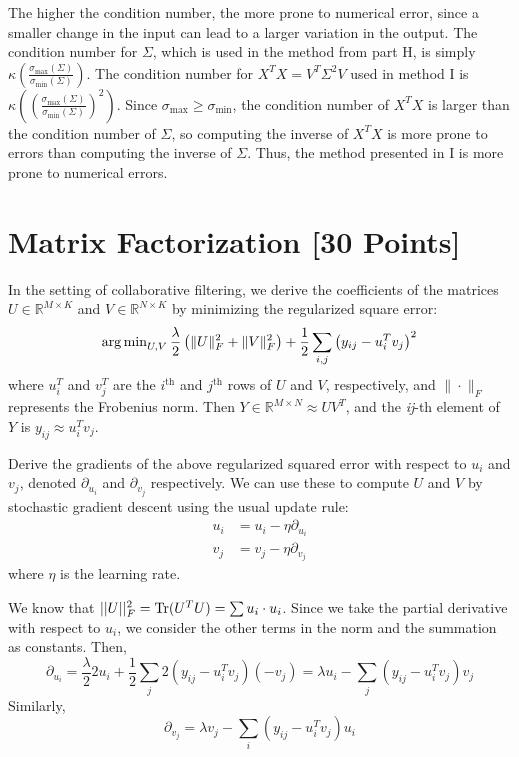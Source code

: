 \begin{solution}
    The higher the condition number, the more prone to numerical error, since a smaller change in the input can lead to a larger variation in the output. The condition number for $\Sigma$, which is used in the method from part H, is simply $\kappa \left(\frac{\sigma_\text{max}(\Sigma)}{\sigma_\text{min}(\Sigma)} \right)$. The condition number for $X^T X = V^T \Sigma^2 V$ used in method I is $\kappa \left( \left( \frac{\sigma_\text{max}(\Sigma)}{\sigma_\text{min}(\Sigma)} \right)^2 \right)$. Since $\sigma_\text{max} \geq \sigma_\text{min}$, the condition number of $X^T X$ is larger than the condition number of $\Sigma$, so computing the inverse of $X^T X$ is more prone to errors than computing the inverse of $\Sigma$. Thus, the method presented in I is more prone to numerical errors.
\end{solution}


\newpage
\section{Matrix Factorization [30 Points]}

In the setting of collaborative filtering, we derive the coefficients of the matrices $U \in \mathbb{R}^{M \times K}$ and $V \in \mathbb{R}^{N \times K}$ by minimizing the regularized square error:
$$\operatorname{arg\,min}_{U,V} \frac{\lambda}{2} \left( \|U\|_F^2 + \|V\|^2_F \right) + \frac{1}{2}\sum_{i,j} \left( y_{ij} - u_i^Tv_j\right)^2$$
where $u_i^T$ and $v_j^T$ are the $i^{\text{th}}$ and $j^{\text{th}}$ rows of $U$ and $V$, respectively, and $\|\cdot\|_F$ represents the Frobenius norm. Then $Y \in \mathbb{R}^{M \times N} \approx UV^T$, and the \textit{ij}-th element of $Y$ is $y_{ij} \approx u_i^Tv_j$.

\problem[5]
Derive the gradients of the above regularized squared error with respect to $u_i$ and $v_j$, denoted $\partial_{u_i}$ and $\partial_{v_j}$ respectively.  We can use these to compute $U$ and $V$ by stochastic gradient descent using the usual update rule: 
\begin{align*}
u_i &= u_i - \eta \partial_{u_i} \\
v_j &= v_j - \eta \partial_{v_j}
\end{align*}
where $\eta$ is the learning rate.

\begin{solution}
    We know that $||U||^2_F = \Tr(U^T U) = \sum u_i \cdot u_i$. Since we take the partial derivative with respect to $u_i$, we consider the other terms in the norm and the summation as constants. Then,
    \[
        \partial_{u_i} = \frac{\lambda}{2} 2 u_i + \frac{1}{2} \sum_j 2 (y_{ij} - u_i^T v_j) (-v_j) = \lambda u_i - \sum_j (y_{ij} - u_i^T v_j) v_j
    \]
    Similarly,
    \[
        \partial_{v_j} = \lambda v_j - \sum_i (y_{ij} - u_i^T v_j) u_i
    \]
\end{solution}

